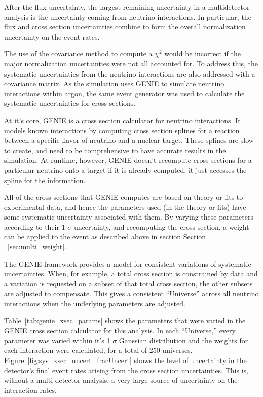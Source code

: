 After the flux uncertainty, the largest remaining uncertainty in a multidetector analysis is the uncertainty coming from neutrino interactions.  In particular, the flux and cross section uncertainties combine to form the overall normalization uncertainty on the event rates.

The use of the covariance method to compute a $\chi^2$ would be incorrect if the major normalization uncertainties were not all accounted for.  To address this, the systematic uncertainties from the neutrino interactions are also addressed with a covariance matrix.  As the simulation uses GENIE \cite{Andreopoulos:2009rq} to simulate neutrino interactions within argon, the same event generator was used to calculate the systematic uncertainties for cross sections.

At it's core, GENIE is a cross section calculator for neutrino interactions.  It models known interactions by computing cross section splines for a reaction between a specific flavor of neutrino and a nuclear target.  These splines are slow to create, and need to be comprehensive to have accurate results in the simulation.  At runtime, however, GENIE doesn't recompute cross sections for a particular neutrino onto a target if it is already computed, it just accesses the spline for the information.

All of the cross sections that GENIE computes are based on theory or fits to experimental data, and hence the parameters used (in the theory or fits) have some systematic uncertainty associated with them.  By varying these parameters according to their 1 $\sigma$ uncertainty, and recomputing the cross section, a weight can be applied to the event as described above in section Section ~\ref{sec:multi_weight}.

The GENIE framework provides a model for consistent variations of systematic uncertainties.  When, for example, a total cross section is constrained by data and a variation is requested on a subset of that total cross section, the other subsets are adjusted to compensate.  This gives a consistent ``Universe'' across all neutrino interactions when the underlying parameters are adjusted.

Table~\ref{tab:genie_xsec_params} shows the parameters that were varied in the GENIE cross section calculator for this analysis.  In each ``Universe,'' every parameter was varied within it's 1 $\sigma$ Gaussian distribution and the weights for each interaction were calculated, for a total of 250 universes.  Figure~\ref{fig:sys_xsec_uncert_fracUncert} shows the level of uncertainty in the detector's final \nue event rates arising from the cross section uncertainties.  This is, without a multi detector analysis, a very large source of uncertainty on the interaction rates.

